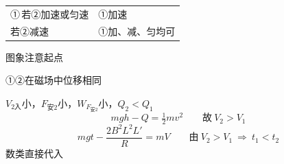 \begin{tabular}{@{}l@{\qquad}l@{}}
①\,若②加速或匀速 & ①加速\\
\hphantom{①\,}若②减速 & ①加、减、匀均可
\end{tabular}

图象注意起点

①②在磁场中位移相同

$V_{2\text{入}}$小，$F_{\text{安}2}$小，$W_{F_{\text{安}2}}$小，$Q_2<Q_1$
\[ mgh-Q=\tfrac12mv^2\qquad \text{故}\ V_2>V_1 \]
\[ mgt-\frac{2B^2L^2L'}{R}=mV\qquad \text{由}\ V_2>V_1\ \Rightarrow\ t_1<t_2 \]
数类直接代入

